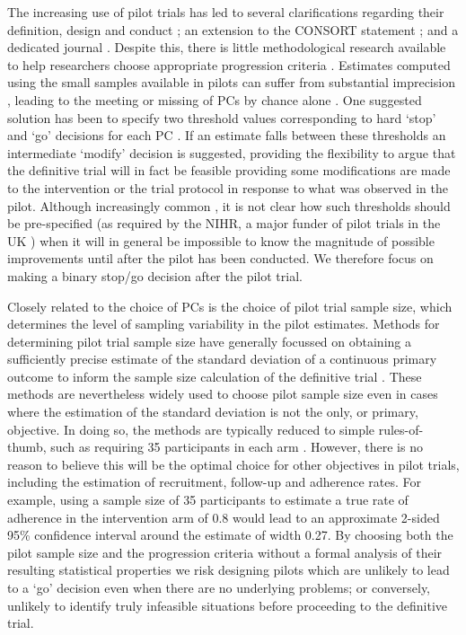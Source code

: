 \documentclass[AMA,STIX1COL]{WileyNJD-v2}
\begin{document}
The increasing use of pilot trials has led to several clarifications regarding their definition, design and conduct \cite{Lancaster2004, Craig2008, Arain2010, Thabane2010, Eldridge2016}; an extension to the CONSORT statement \cite{Eldridge2016a}; and a dedicated journal \cite{Lancaster2015}. Despite this, there is little methodological research available to help researchers choose appropriate progression criteria \cite{Avery2017}. Estimates computed using the small samples available in pilots can suffer from substantial imprecision \cite{Cooper2018}, leading to the meeting or missing of PCs by chance alone \cite{Eldridge2015}. One suggested solution has been to specify two threshold values corresponding to hard `stop' and `go' decisions for each PC \cite{Avery2017}. If an estimate falls between these thresholds an intermediate `modify' decision is suggested, providing the flexibility to argue that the definitive trial will in fact be feasible providing some modifications are made to the intervention or the trial protocol in response to what was observed in the pilot. Although increasingly common \cite{Eldridge2016a}, it is not clear how such thresholds should be pre-specified (as required by the NIHR, a major funder of pilot trials in the UK \cite{NIHR2017}) when it will in general be impossible to know the magnitude of possible improvements until after the pilot has been conducted. We therefore focus on making a binary stop/go decision after the pilot trial.


Closely related to the choice of PCs is the choice of pilot trial sample size, which determines the level of sampling variability in the pilot estimates. Methods for determining pilot trial sample size have generally focussed on obtaining a sufficiently precise estimate of the standard deviation of a continuous primary outcome to inform the sample size calculation of the definitive trial \cite{Browne1995, Julious2005, Sim2012, Teare2014, Eldridge2015, Whitehead2015}. These methods are nevertheless widely used to choose pilot sample size even in cases where the estimation of the standard deviation is not the only, or primary, objective. In doing so, the methods are typically reduced to simple rules-of-thumb, such as requiring 35 participants in each arm \cite{Teare2014}. However, there is no reason to believe this will be the optimal choice for other objectives in pilot trials, including the estimation of recruitment, follow-up and adherence rates. For example, using a sample size of 35 participants to estimate a true rate of adherence in the intervention arm of 0.8 would lead to an approximate 2-sided 95\% confidence interval around the estimate of width 0.27. By choosing both the pilot sample size and the progression criteria without a formal analysis of their resulting statistical properties we risk designing pilots which are unlikely to lead to a `go' decision even when there are no underlying problems; or conversely, unlikely to identify truly infeasible situations before proceeding to the definitive trial.
\end{document}

